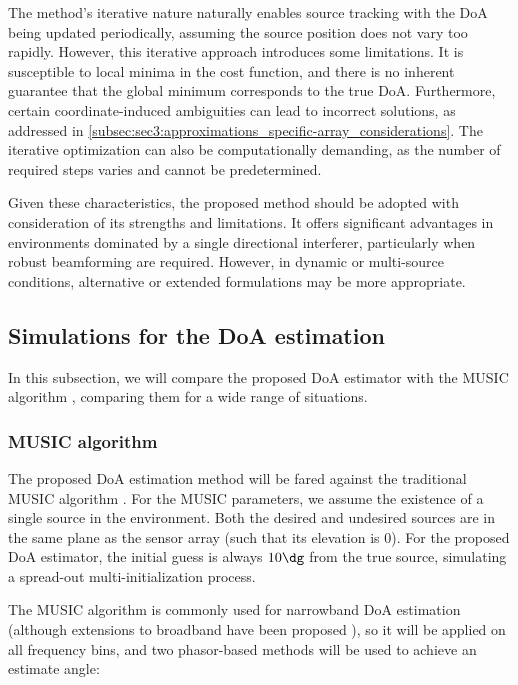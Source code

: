 The method's iterative nature naturally enables source tracking with the DoA being updated periodically, assuming the source position does not vary too rapidly. However, this iterative approach introduces some limitations. It is susceptible to local minima in the cost function, and there is no inherent guarantee that the global minimum corresponds to the true DoA. Furthermore, certain coordinate-induced ambiguities can lead to incorrect solutions, as addressed in \cref{subsec:sec3:approximations_specific-array_considerations}. The iterative optimization can also be computationally demanding, as the number of required steps varies and cannot be predetermined.

Given these characteristics, the proposed method should be adopted with consideration of its strengths and limitations. It offers significant advantages in environments dominated by a single directional interferer, particularly when robust beamforming are required. However, in dynamic or multi-source conditions, alternative or extended formulations may be more appropriate.

\subsection{Simulations for the DoA estimation}
\label{subsec:sec3:results_doa_estimation}

In this subsection, we will compare the proposed DoA estimator with the MUSIC algorithm \cite{gupta_music_2015}, comparing them for a wide range of situations.

\subsubsection*{MUSIC algorithm}
The proposed DoA estimation method will be fared against the traditional MUSIC algorithm \cite{gupta_music_2015}. For the MUSIC parameters, we assume the existence of a single source in the environment. Both the desired and undesired sources are in the same plane as the sensor array (such that its elevation is $0$). For the proposed DoA estimator, the initial guess is always $10\dg$ from the true source, simulating a spread-out multi-initialization process.

The MUSIC algorithm is commonly used for narrowband DoA estimation (although extensions to broadband have been proposed \cite{alrmah_extension_2011}), so it will be applied on all frequency bins, and two phasor-based methods will be used to achieve an estimate angle:

